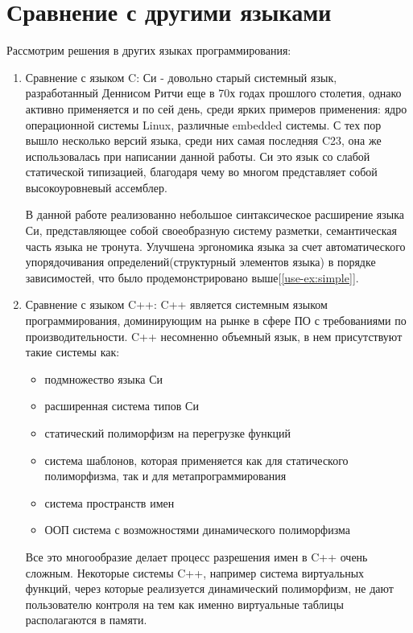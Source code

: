 \section{Сравнение с другими языками}
Рассмотрим решения в других языках программирования:

\begin{enumerate}
\item\label{langcmp:c} Сравнение с языком C:\newline
Си - довольно старый системный язык, разработанный Деннисом Ритчи еще в 70х годах прошлого столетия, однако активно применяется и по сей день, среди ярких примеров применения: ядро операционной системы Linux, различные embedded системы.
С тех пор вышло несколько версий языка, среди них самая последняя C23, она же использовалась при написании данной работы.
Си это язык со слабой статической типизацией, благодаря чему во многом представляет собой высокоуровневый ассемблер.

В данной работе реализованно небольшое синтаксическое расширение языка Си, представляющее собой своеобразную систему разметки, семантическая часть языка не тронута.
Улучшена эргономика языка за счет автоматического упорядочивания определений(структурный элементов языка) в порядке зависимостей, что было продемонстрировано выше[\ref{use-ex:simple}].



\item\label{langcmp:cpp} Сравнение с языком C++:\newline
C++ является системным языком программирования, доминирующим на рынке в сфере ПО с требованиями по производительности. 
C++ несомненно объемный язык, в нем присутствуют такие системы как:
\begin{itemize}
\item подмножество языка Си
\item расширенная система типов Си
\item статический полиморфизм на перегрузке функций
\item система шаблонов, которая применяется как для статического полиморфизма, так и для метапрограммирования
\item система пространств имен
\item ООП система с возможностями динамического полиморфизма
\end{itemize}

Все это многообразие делает процесс разрешения имен в C++ очень сложным. 
Некоторые системы C++, например система виртуальных функций, через которые реализуется динамический полиморфизм, 
не дают пользователю контроля на тем как именно виртуальные таблицы располагаются в памяти.


\end{enumerate}
